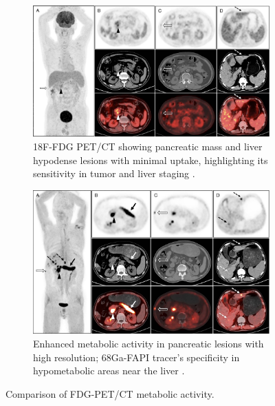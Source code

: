\begin{figure}[ht]
	\centering
	\begin{subfigure}[b]{\textwidth}
		\centering
		\includegraphics[width=\textwidth]{assets/Deng1.png}
		\caption{18F-FDG PET/CT showing pancreatic mass and liver hypodense lesions with minimal uptake, highlighting its sensitivity in tumor and liver staging \cite{Deng2021}.}
		\label{fig:Deng1}
	\end{subfigure}
	\vspace{1em} %
	\begin{subfigure}[b]{\textwidth}
		\centering
		\includegraphics[width=\textwidth]{assets/Deng268GaComplete.png}
		\caption{Enhanced metabolic activity in pancreatic lesions with high resolution; 68Ga-FAPI tracer’s specificity in hypometabolic areas near the liver \cite{Deng2021}.}
		\label{fig:Deng268Ga}
	\end{subfigure}
	\caption{Comparison of FDG-PET/CT metabolic activity.}
	\label{fig:DengMerged}
\end{figure}




\FloatBarrier %